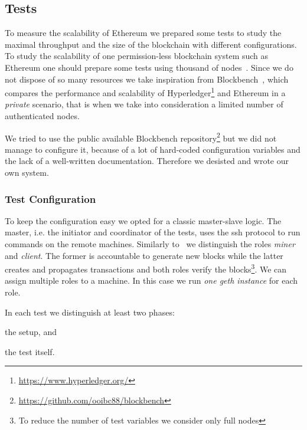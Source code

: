 \subsection{Tests}

To measure the scalability of Ethereum we prepared some tests to study
the maximal throughput and the size of the blockchain with different
configurations.
To study the scalability of one permission-less blockchain system such as
Ethereum one should prepare some tests using thousand of 
nodes~\cite{bib:securityAndScalabilityPoW, bib:algorand}.
Since we do not dispose of so many resources we take inspiration from
Blockbench~\cite{blockbench}, which compares the performance and scalability
of Hyperledger\footnote{\url{https://www.hyperledger.org/}} and Ethereum in a
\emph{private} scenario, that is when 
we take into consideration a limited number of authenticated nodes.

We tried to use the public available Blockbench 
repository\footnote{\url{https://github.com/ooibc88/blockbench}}
but we did not manage to configure it, because of a lot of hard-coded
configuration variables and the lack of a well-written documentation.
Therefore we desisted and wrote our own system.


\subsubsection{Test Configuration}

To keep the configuration easy we opted for a classic master-slave logic.
The master, i.e. the initiator and coordinator of the tests, uses the ssh
protocol to run commands on the remote machines.
Similarly to~\cite{blockbench} we distinguish the roles \emph{miner} and
\emph{client}. The former is accountable to generate new blocks while the
latter creates and propagates transactions and both roles verify the 
blocks\footnote{To reduce the number of test variables we consider only 
	full nodes}.
We can assign multiple roles to a machine. In this case we run
\emph{one geth instance} for each role.



In each test we distinguish at least two phases:
\begin{enumerate*}
	\item the setup, and
	\item the test itself.
\end{enumerate*}


